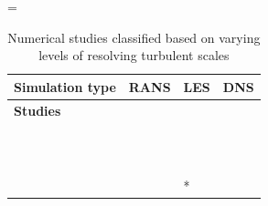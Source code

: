 \documentclass[a4paper,12pt]{elsarticle}
\begin{document}
\begin{center}
\captionsetup{font=normalsize}
\footnotesize
\LTcapwidth=\textwidth
\begin{longtable}{|m{3cm}|m{4.3cm}|m{4.4cm}|m{3.2cm}|}
    \caption{Numerical studies classified based on varying levels of resolving turbulent scales}
    \label{tab:num}\\
    \hline
    \centering \textbf{Simulation type} & \centering \textbf{RANS} & \centering \textbf{LES} & \center \textbf{DNS} \\
    \hline
    \centering \textbf{Studies} & \citet{ren2021numerical} & \citet{feng2020study} & \citet{giri2022colliding} \\
    
     & \citet{li2020investigating} & \citet{khosronejad2020fluid} & \citet{chong2021extended} \\
    
     & \citet{dbouk2020respiratory} & \citet{zhang2019distribution} & \citet{diwan2020understanding} \\
    
     & \citet{liu2020experimental} & \citet{berrouk2010experimental} & \citet{singhal2022virus} \\
    
     & \citet{dbouk2020coughing} & \citet{pendar2020numerical} & \citet{rosti2020fluid} \\
    
     & \citet{aliyu2021dispersion} & \citet{abkarian2020speech} &  \\
    
     & \citet{zhou2021experimental} & \citet{saarinen2015large} &  \\
    
     & \citet{mirzaie2021covid} & \citet{li2023transient} &  \\
    
     & \citet{qian2008dispersion} & \citet{liu2021simulation} &  \\
    
     & \citet{li2005role} & \citet{quintero2022reducing} &  \\
    
     & \citet{villafruela2019assessment} & \citet{buchan2020predicting} &  \\
    
     & \citet{he2011cfd} & \citet{wu2023numerical} &  \\
    
     & \citet{jiang2009investigating} & \citet{fontes2020study}* &  \\
    

\end{longtable}
\end{center}
\end{document}
